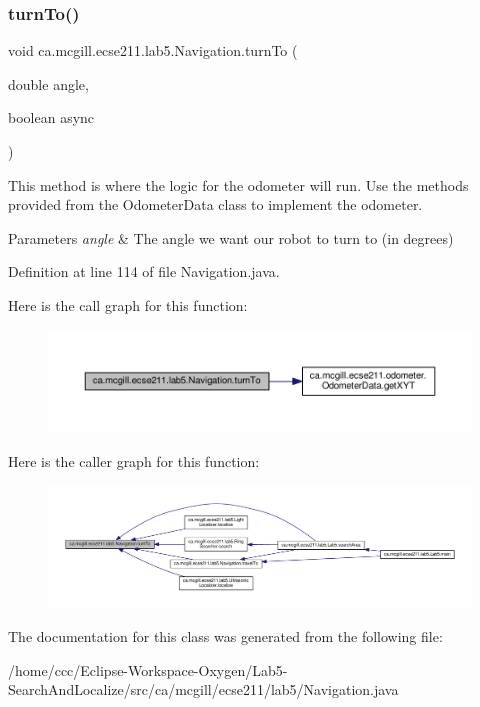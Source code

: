 \subsubsection{\texorpdfstring{turn\+To()}{turnTo()}}
{\footnotesize\ttfamily void ca.\+mcgill.\+ecse211.\+lab5.\+Navigation.\+turn\+To (\begin{DoxyParamCaption}\item[{double}]{angle,  }\item[{boolean}]{async }\end{DoxyParamCaption})}

This method is where the logic for the odometer will run. Use the methods provided from the Odometer\+Data class to implement the odometer.


\begin{DoxyParams}{Parameters}
{\em angle} & The angle we want our robot to turn to (in degrees) \\
\hline
\end{DoxyParams}


Definition at line 114 of file Navigation.\+java.

Here is the call graph for this function\+:
\nopagebreak
\begin{figure}[H]
\begin{center}
\leavevmode
\includegraphics[width=350pt]{classca_1_1mcgill_1_1ecse211_1_1lab5_1_1_navigation_a2b39928c8062fe6863de8e818d009e91_cgraph}
\end{center}
\end{figure}
Here is the caller graph for this function\+:
\nopagebreak
\begin{figure}[H]
\begin{center}
\leavevmode
\includegraphics[width=350pt]{classca_1_1mcgill_1_1ecse211_1_1lab5_1_1_navigation_a2b39928c8062fe6863de8e818d009e91_icgraph}
\end{center}
\end{figure}


The documentation for this class was generated from the following file\+:\begin{DoxyCompactItemize}
\item 
/home/ccc/\+Eclipse-\/\+Workspace-\/\+Oxygen/\+Lab5-\/\+Search\+And\+Localize/src/ca/mcgill/ecse211/lab5/Navigation.\+java\end{DoxyCompactItemize}
